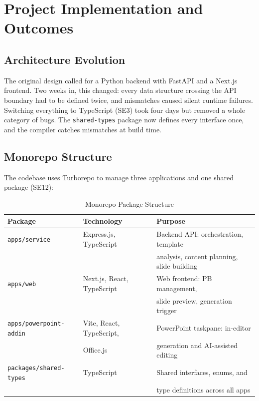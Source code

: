 \section{Project Implementation and Outcomes}
\label{sec:implementation}

\subsection{Architecture Evolution}

The original design called for a Python backend with FastAPI and a Next.js frontend. Two weeks in, this changed: every data structure crossing the API boundary had to be defined twice, and mismatches caused silent runtime failures. Switching everything to TypeScript (SE3) took four days but removed a whole category of bugs. The \texttt{shared-types} package now defines every interface once, and the compiler catches mismatches at build time.

\subsection{Monorepo Structure}

The codebase uses Turborepo to manage three applications and one shared package (SE12):

\begin{table}[H]
\centering
\begin{tabular}{|l|l|l|}
\hline
\rowcolor{gray!20} \textbf{Package} & \textbf{Technology} & \textbf{Purpose} \\
\hline
\texttt{apps/service} & Express.js, TypeScript & Backend API: orchestration, template \\
 & & analysis, content planning, slide building \\
\hline
\texttt{apps/web} & Next.js, React, TypeScript & Web frontend: PB management, \\
 & & slide preview, generation trigger \\
\hline
\texttt{apps/powerpoint-addin} & Vite, React, TypeScript, & PowerPoint taskpane: in-editor \\
 & Office.js & generation and AI-assisted editing \\
\hline
\texttt{packages/shared-types} & TypeScript & Shared interfaces, enums, and \\
 & & type definitions across all apps \\
\hline
\end{tabular}
\caption{Monorepo Package Structure}
\label{tab:monorepo}
\end{table}

